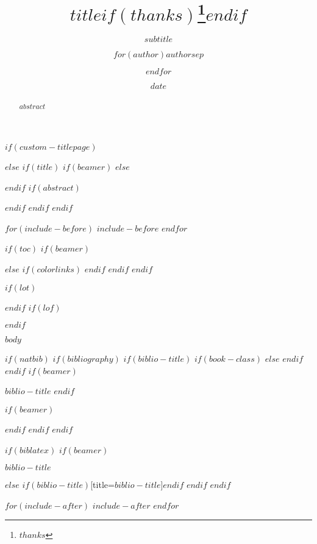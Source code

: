 \documentclass[
  $if(fontsize)$
    $fontsize$,
  $endif$
  $if(lang)$
    $babel-lang$,
  $endif$
  $if(papersize)$
    $papersize$paper,
  $endif$
  $if(beamer)$
    ignorenonframetext,
    $if(handout)$
      handout,
    $endif$
    $if(aspectratio)$
      aspectratio=$aspectratio$,
    $endif$
  $endif$
  $for(classoption)$
    $classoption$$sep$,
  $endfor$
]{$documentclass$}
\title{$title$$if(thanks)$\thanks{$thanks$}$endif$}
\subtitle{$subtitle$}
\author{$for(author)$$author$$sep$ \and $endfor$}
\institute{$for(institute)$$institute$$sep$ \and $endfor$}
\date{$date$}
\newif\ifbibliography
\numberwithin{equation}{section} %
\numberwithin{figure}{section} %
\numberwithin{table}{section} %
\begin{document}
$if(custom-titlepage)$
  
  \newpage
$else$
  $if(title)$
    $if(beamer)$
      \frame{\titlepage}
    $else$
      \maketitle
    $endif$
    $if(abstract)$
      \begin{abstract}
      $abstract$
      \end{abstract}
    $endif$
  $endif$
$endif$

$for(include-before)$
  $include-before$
$endfor$

$if(toc)$
  $if(beamer)$
    \begin{frame}
    \tableofcontents[hideallsubsections]
    \end{frame}
  $else$
    $if(colorlinks)$
      \hypersetup{linkcolor=$if(toccolor)$$toccolor$$else$$endif$}
    $endif$
    \setcounter{tocdepth}{$toc-depth$}
    \tableofcontents
  $endif$
$endif$

$if(lot)$
  \listoftables
$endif$
$if(lof)$
  \listoffigures
$endif$

\newpage

$body$

$if(natbib)$
  $if(bibliography)$
    $if(biblio-title)$
      $if(book-class)$
        \renewcommand\bibname{$biblio-title$}
      $else$
        \renewcommand\refname{$biblio-title$}
      $endif$
    $endif$
    $if(beamer)$
      \begin{frame}[allowframebreaks]{$biblio-title$}
        \bibliographytrue
    $endif$
    
    $if(beamer)$
      \end{frame}
    $endif$
  $endif$
$endif$

$if(biblatex)$
  $if(beamer)$
    \begin{frame}[allowframebreaks]{$biblio-title$}
    \bibliographytrue
    \printbibliography[heading=none]
    \end{frame}
  $else$
    \printbibliography$if(biblio-title)$[title=$biblio-title$]$endif$
  $endif$
$endif$

$for(include-after)$
  $include-after$
$endfor$
\end{document}
